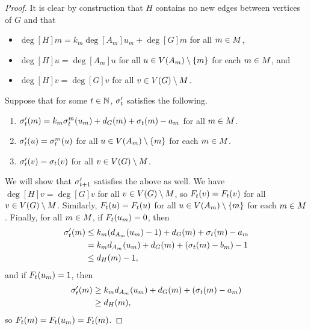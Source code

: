 \begin{proof}
It is clear by construction that $H$ contains no new edges between vertices of
$G$ and that
\begin{itemize}
\item $\deg[H]{m} = k_m\deg[{A_m}]{u_m} + \deg[G]{m}$ for all $m \in \mots$,
\item $\deg[H]{u} = \deg[{A_m}]{u}$ for all $u \in \V[A_m] \setminus \{m\}$ for
  each $m \in \mots$, and
\item $\deg[H]{v} = \deg[G]{v}$ for all $v \in \V \setminus \mots$.
\end{itemize}
Suppose that for some $t \in \nats$, $\pos[\s']{t}$ satisfies the following.
\begin{enumerate} \label{posAtT}
\item $\chips[\s']{m}{t} = k_m\chips[\s^m]{u_m}{t} + \deg[G]{m} + \chips{m}{t}
  - a_m$ for all $m \in \mots$.
\item $\chips[\s']{u}{t} = \chips[\s^m]{u}{t}$ for all $u \in \V[A_m] \setminus
  \{m\}$ for each $m \in \mots$.
\item $\chips[\s']{v}{t} = \chips{v}{t}$ for all $v \in \V \setminus \mots$.
\end{enumerate}
We will show that $\pos[\s']{t+1}$ satisfies the above as well. We have
$\deg[H]{v} = \deg[G]{v}$ for all $v \in \V \setminus \mots$, so
$\firing[\s']{v}{t} = \firing{v}{t}$ for all $v \in \V \setminus
\mots$. Similarly, $\firing[\s']{u}{t} = \firing[\s^m]{u}{t}$ for all $u \in
\V[A_m] \setminus \{m\}$ for each $m \in \mots$. Finally, for all $m \in
\mots$, if $\firing[\s^m]{u_m}{t} = 0$, then
\begin{align*}
  \chips[\s']{m}{t} &\leq k_m(\deg[{A_m}]{u_m}-1) + \deg[G]{m} + \chips{m}{t} -
  a_m \\
  &= k_m\deg[{A_m}]{u_m} + \deg[G]{m} + (\chips{m}{t} - b_m) - 1 \\
  &\leq \deg[H]{m} - 1,
\end{align*}
and if $\firing[\s^m]{u_m}{t} = 1$, then
\begin{align*}
  \chips[\s']{m}{t} &\geq k_m\deg[{A_m}]{u_m} + \deg[G]{m} + (\chips{m}{t} - a_m)
  \\
  &\geq \deg[H]{m},
\end{align*}
so $\firing[\s']{m}{t} = \firing[\s^m]{u_m}{t} = \firing{m}{t}$.


\end{proof}
